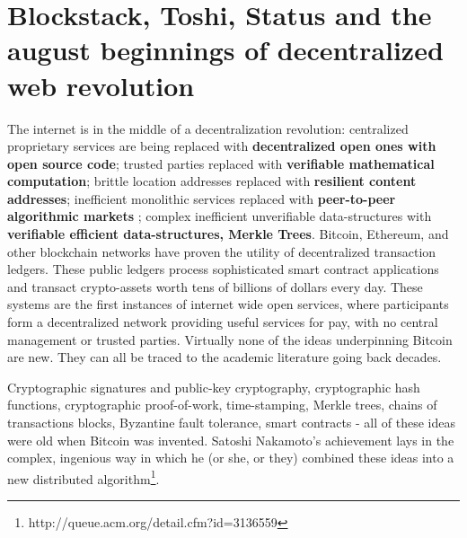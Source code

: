 \documentclass{article}
\begin{document}
\section{Blockstack, Toshi, Status and the august beginnings of decentralized
  web revolution}
  The internet is in the middle of a decentralization revolution: centralized proprietary services are being replaced with \textbf{decentralized open ones with open source code}; trusted parties replaced with \textbf{verifiable mathematical computation}; brittle location addresses replaced with \textbf{resilient content addresses}; inefficient monolithic services replaced with \textbf{peer-to-peer algorithmic markets} ; complex inefficient unverifiable data-structures with \textbf{verifiable efficient data-structures, Merkle Trees}. Bitcoin, Ethereum, and other blockchain networks have proven the utility of decentralized transaction ledgers. These public ledgers process sophisticated smart contract applications and transact crypto-assets worth tens of billions of dollars every day. These systems are the first instances of internet wide open services, where participants form a decentralized network providing useful services for pay, with no central management or trusted parties.
Virtually none of the ideas underpinning Bitcoin are new. They can all be traced to the academic literature going back decades.

  Cryptographic signatures and public-key cryptography, cryptographic hash functions, cryptographic proof-of-work, time-stamping, Merkle trees, chains of transactions blocks, Byzantine fault tolerance, smart contracts - all of these ideas were old when Bitcoin was invented.
  Satoshi Nakamoto's achievement lays in the complex, ingenious way in which he (or she, or they) combined these ideas into a new distributed algorithm\footnote{http://queue.acm.org/detail.cfm?id=3136559}.
  

  
\end{document}
